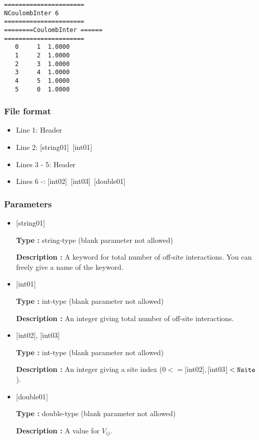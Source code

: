 \begin{minipage}{12.5cm}
\begin{screen}
\begin{verbatim}
====================== 
NCoulombInter 6  
====================== 
========CoulombInter ====== 
====================== 
   0     1  1.0000
   1     2  1.0000
   2     3  1.0000
   3     4  1.0000
   4     5  1.0000
   5     0  1.0000
\end{verbatim}
\end{screen}
\end{minipage}

\subsubsection{File format}
 \begin{itemize}
   \item  Line 1:  Header
   \item  Line 2:   [string01]~[int01]
   \item  Lines 3 - 5:  Header
   \item  Lines 6 -: 
   [int02]~[int03]~[double01] 
  \end{itemize}
\subsubsection{Parameters}
 \begin{itemize}

   \item  $[$string01$]$
   
    {\bf Type :} string-type (blank parameter not allowed)

   {\bf Description :} A keyword for total number of off-site interactions. You can freely give a name of the keyword.

   \item  $[$int01$]$
   
    {\bf Type :} int-type (blank parameter not allowed)

   {\bf Description :}  An integer giving total number of off-site interactions.

  \item  $[$int02$]$, $[$int03$]$
  
 {\bf Type :} int-type (blank parameter not allowed)

{\bf Description :} An integer giving a site index ($0<= [$int02$], [$int03$]<\verb|Nsite|$).
 
 \item  $[$double01$]$
   
   {\bf Type :} double-type (blank parameter not allowed)

  {\bf Description :}  A value for $V_{ij}$.
  
\end{itemize}

